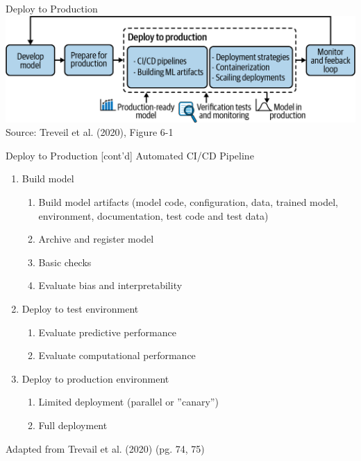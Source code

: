 \documentclass[ignorenonframetext,xcolor=x11names]{beamer}
\begin{document}
\begin{frame}{Deploy to Production}
\centering
\includegraphics[width=\textwidth]{imlo_0601.png} \\

\vspace{\baselineskip}
\scriptsize Source: Treveil et al. (2020), Figure 6-1
\end{frame}

\begin{frame}{Deploy to Production \small [cont'd]}
\large Automated CI/CD Pipeline \normalsize \\

\begin{enumerate}
\item Build model
\begin{enumerate}
   \item Build model artifacts (model code, configuration, data, trained model, environment, documentation, test code and test data)
   \item Archive and register model
   \item Basic checks
   \item Evaluate bias and interpretability 
\end{enumerate}
\item Deploy to test environment
\begin{enumerate}
    \item Evaluate predictive performance
    \item Evaluate computational performance
\end{enumerate}
\item Deploy to production environment
\begin{enumerate}
   \item Limited deployment (parallel or ''canary'')
   \item Full deployment
\end{enumerate}
\end{enumerate} 

\vspace{\baselineskip}
\tiny Adapted from Trevail et al. (2020) (pg. 74, 75)
\end{frame}
\end{document}
